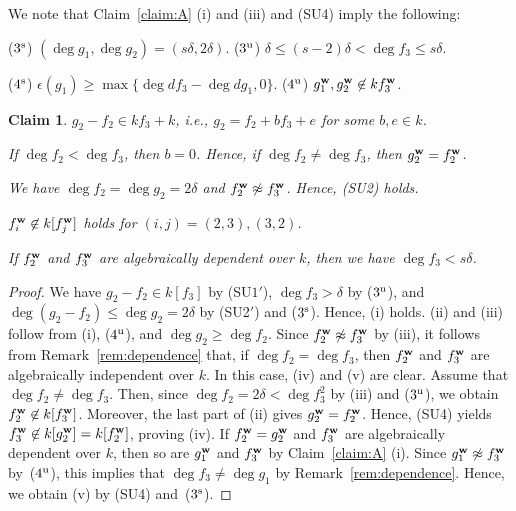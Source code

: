 \documentclass{amsart}
\theoremstyle{plain}
\newtheorem{claim}{Claim}
\theoremstyle{definition}
\newcommand{\nd}{\noindent}
\newcommand{\ep}{\epsilon}
\newcommand{\w}{{\bf w}}
\begin{document}
We note that 
Claim~\ref{claim:A} (i) and (iii) and (SU4) 
imply the following: 



($3^{\rm s}$) $(\deg g_1,\deg g_2)=(s\delta ,2\delta )$. 
\quad 
($3^{\rm u}$) $\delta \le (s-2)\delta <\deg f_3\le s\delta $. 

($4^{\rm s}$) $\ep (g_1)\ge \max \{ \deg df_3-\deg dg_1,0\} $. 
\quad 
($4^{\rm u}$) $g_1^{\w },g_2^{\w }\not\in kf_3^{\w }$. 


\begin{claim}\label{claim:g2}
\nd {\rm (i)} 
$g_2-f_2\in kf_3+k$, i.e., 
$g_2=f_2+bf_3+e$ for some $b,e\in k$. 


\nd{\rm (ii)} 
If $\deg f_2<\deg f_3$, 
then $b=0$. 
Hence, if $\deg f_2\ne \deg f_3$, 
then $g_2^{\w }=f_2^{\w }$. 


\nd{\rm (iii)} We have $\deg f_2=\deg g_2=2\delta $ 
and $f_2^{\w }\not\approx f_3^{\w }$. 
Hence, {\rm (SU2)} holds. 


\nd{\rm (iv)} 
$f_i^{\w }\not\in k[f_j^{\w }]$ holds for $(i,j)=(2,3),(3,2)$. 


\nd{\rm (v)} 
If $f_2^{\w }$ and $f_3^{\w }$ are algebraically dependent over $k$, 
then we have $\deg f_3<s\delta $. 
\end{claim}
\begin{proof}
We have 
$g_2-f_2\in k[f_3]$ by (SU$1'$), 
$\deg f_3>\delta $ by ($3^{\rm u}$), 
and $\deg (g_2-f_2)\le \deg g_2=2\delta $ 
by (SU2$'$) and ($3^{\rm s}$). 
Hence, (i) holds. 
(ii) and (iii) follow from (i), 
($4^{\rm u}$), and $\deg g_2\ge \deg f_2$. 
Since $f_2^{\w }\not\approx f_3^{\w }$ by (iii), 
it follows from Remark~\ref{rem:dependence} that, 
if $\deg f_2=\deg f_3$, 
then $f_2^{\w }$ and $f_3^{\w }$ 
are algebraically independent over $k$. 
In this case, (iv) and (v) are clear. 
Assume that $\deg f_2\ne \deg f_3$. 
Then, 
since $\deg f_2=2\delta <\deg f_3^2$ 
by (iii) and ($3^{\rm u}$), 
we obtain $f_2^{\w }\not\in k[f_3^{\w }]$. 
Moreover, 
the last part of 
(ii) gives $g_2^{\w }=f_2^{\w }$. 
Hence, (SU4) yields 
$f_3^{\w }\not\in k[g_2^{\w }]=k[f_2^{\w }]$, 
proving (iv). 
If $f_2^{\w }=g_2^{\w }$ and $f_3^{\w }$ are algebraically dependent over $k$, 
then so are $g_1^{\w }$ and $f_3^{\w }$ by 
Claim~\ref{claim:A} (i). 
Since $g_1^{\w }\not\approx f_3^{\w }$ by~($4^{\rm u}$), 
this implies that 
$\deg f_3\ne \deg g_1$ by Remark~\ref{rem:dependence}. 
Hence, we obtain (v) by (SU4) and~($3^{\rm s}$). 
\end{proof}
\end{document}
